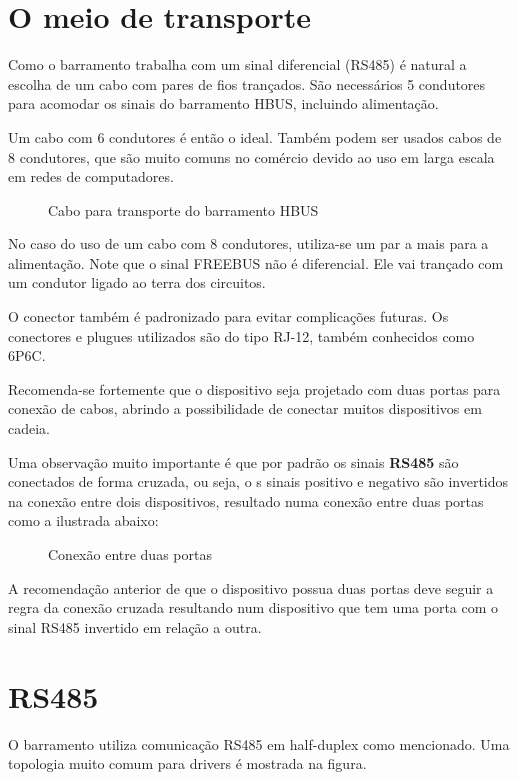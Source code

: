 \documentclass[11pt]{report}
\begin{document}
\section{O meio de transporte}

Como o barramento trabalha com um sinal diferencial (RS485) é natural a escolha de um cabo com pares de fios trançados. São necessários 5 condutores para acomodar os sinais do barramento HBUS, incluindo alimentação.

Um cabo com 6 condutores é então o ideal. Também podem ser usados cabos de 8 condutores, que são muito comuns no comércio devido ao uso em larga escala em redes de computadores.

\begin{figure}[H]
\centering
%
\caption{Cabo para transporte do barramento HBUS}
\end{figure}

No caso do uso de um cabo com 8 condutores, utiliza-se um par a mais para a alimentação. Note que o sinal FREEBUS não é diferencial. Ele vai trançado com um condutor ligado ao terra dos circuitos.

O conector também é padronizado para evitar complicações futuras. Os conectores e plugues utilizados são do tipo RJ-12, também conhecidos como 6P6C.

Recomenda-se fortemente que o dispositivo seja projetado com duas portas para conexão de cabos, abrindo a possibilidade de conectar muitos dispositivos em cadeia.

Uma observação muito importante é que por padrão os sinais \textbf{RS485} são conectados de forma cruzada, ou seja, o s sinais positivo e negativo são invertidos na conexão entre dois dispositivos, resultado numa conexão entre duas portas como a ilustrada abaixo:

\begin{figure}[H]
\centering
%
\caption{Conexão entre duas portas}
\end{figure}

A recomendação anterior de que o dispositivo possua duas portas deve seguir a regra da conexão cruzada resultando num dispositivo que tem uma porta com o sinal RS485 invertido em relação a outra.

\section{RS485}

O barramento utiliza comunicação RS485 em half-duplex como mencionado. Uma topologia muito comum para drivers é mostrada na figura.
\end{document}
